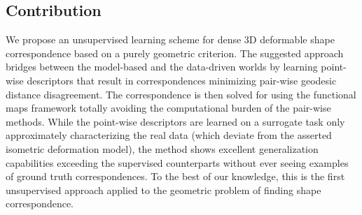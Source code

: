\documentclass[10pt,twocolumn,letterpaper]{article}
\newcommand\comment[1]{{}}
\begin{document}
\subsection{Contribution}

We propose an unsupervised learning scheme for dense 3D deformable shape correspondence based on a purely geometric criterion. 
The suggested approach bridges between the model-based and the data-driven worlds by learning point-wise descriptors that result in correspondences minimizing pair-wise geodesic distance disagreement. 
The correspondence is then solved for using the functional maps framework \cite{ovsjanikov12} totally avoiding the computational burden of the pair-wise methods. 
While the point-wise descriptors are learned on a surrogate task only approximately characterizing the real data (which deviate from the asserted isometric deformation model), the method shows excellent generalization capabilities exceeding the supervised counterparts without ever seeing examples of ground truth correspondences. 
To the best of our knowledge, this is the first unsupervised approach applied to the geometric problem of finding shape correspondence.  

\comment{
Winning traditional algos - with respect to the performance and still generalizing (prove both claims with graphs)
Winning Learning algos - same performance, don't use data!!!! 

Integrating axiomatic reasoning about invariant properties of shapes, like the inter-geodesic distances between surface points, allow us to efficiently train a deep neural network that lends itself for accurate matching of shapes. 
The suggested marriage between an axiomatic methodology within a deep neural network framework brings up the best of these seemingly unrelated two worlds.
If so Emphasize this? \orl{be careful here. Basically all traditional methods pre-deep learning are unsupervised...we're combining this domain knowledge with modern and more accurate DL techniques}
\oshri{Right! The idea is that we have two frontiers: traditional algos and learning algos. We want to show that we are superior in both frontiers. Traditional algos are indeed unsupervised, but have lesser performance. We win. Learning algos have good performance but use ground truth data. We don't, again we ain. Conclusion: the fusion of axioms + leaning is winning each of the paradigms.}
}
\end{document}
